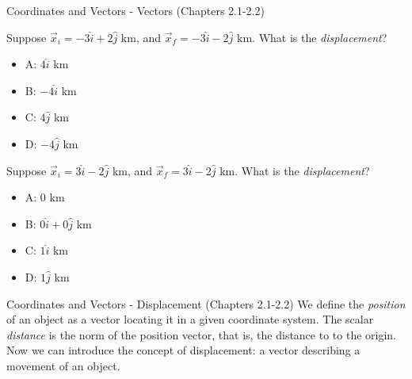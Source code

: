 \documentclass{beamer}
\begin{document}
\begin{frame}{Coordinates and Vectors - Vectors (Chapters 2.1-2.2)}
\small
\begin{minipage}[b]{0.45\linewidth}
Suppose $\vec{x}_i = -3\hat{i} + 2\hat{j}$ km, and $\vec{x}_f = -3\hat{i} - 2\hat{j}$ km.  What is the \textit{displacement}?
\vspace{0.2cm}
\begin{itemize}
\item A: $4\hat{i}$ km
\item B: $-4\hat{i}$ km
\item C: $4\hat{j}$ km
\item D: $-4\hat{j}$ km
\end{itemize}
\end{minipage}
\hspace{0.5cm}
\begin{minipage}[b]{0.45\linewidth}
Suppose $\vec{x}_i = 3\hat{i} - 2\hat{j}$ km, and $\vec{x}_f = 3\hat{i} - 2\hat{j}$ km.  What is the \textit{displacement}?
\vspace{0.2cm}
\begin{itemize}
\item A: 0 km
\item B: $0\hat{i} + 0\hat{j}$ km
\item C: $1\hat{i}$ km
\item D: $1\hat{j}$ km
\end{itemize}
\end{minipage}
\end{frame}

\begin{frame}{Coordinates and Vectors - Displacement (Chapters 2.1-2.2)}
We define the \textit{position} of an object as a vector locating it in a given coordinate system.  The scalar \textit{distance} is the norm of the position vector, that is, the distance to to the origin. \\
\vspace{0.5cm}
Now we can introduce the concept of \alert{displacement}: a vector describing a movement of an object.
\end{frame}
\end{document}
